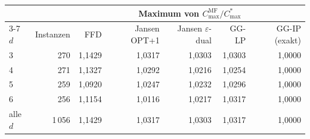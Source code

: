 \begin{tabular}{lrrrrrr}
\toprule
& & \multicolumn{5}{c}{Maximum von $C^{\mathrm{MF}}_{\max}/C^{*}_{\max}$} \\
\cmidrule(lr){3-7}
$d$ & Instanzen & FFD & Jansen OPT+1 & Jansen $\varepsilon$-dual & GG-LP & GG-IP (exakt) \\
\midrule
3 & 270 & 1{,}1429 & 1{,}0317 & 1{,}0303 & 1{,}0303 & 1{,}0000 \\
4 & 271 & 1{,}1327 & 1{,}0292 & 1{,}0216 & 1{,}0254 & 1{,}0000 \\
5 & 259 & 1{,}0920 & 1{,}0247 & 1{,}0232 & 1{,}0296 & 1{,}0000 \\
6 & 256 & 1{,}1154 & 1{,}0116 & 1{,}0217 & 1{,}0317 & 1{,}0000 \\
\midrule
alle $d$ & 1\,056 & 1{,}1429 & 1{,}0317 & 1{,}0303 & 1{,}0317 & 1{,}0000 \\
\bottomrule
\end{tabular}
